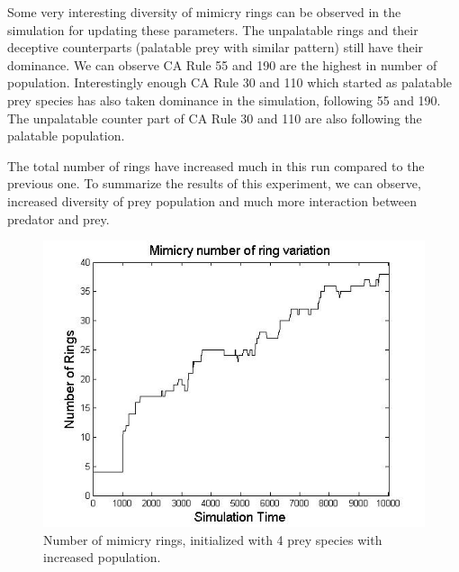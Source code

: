 \documentclass[letterpaper]{article}
\numberwithin{equation}{section}
\begin{document}
Some very interesting diversity of mimicry rings can be observed in the simulation for updating these parameters. The unpalatable rings and their deceptive counterparts (palatable prey with similar pattern) still have their dominance. We can observe CA Rule 55 and 190 are the highest in number of population. Interestingly enough CA Rule 30 and 110 which started as palatable prey species has also taken dominance in the simulation, following 55 and 190. The unpalatable counter part of CA Rule 30 and 110 are also following the palatable population. 

The total number of rings have increased much in this run compared to the previous one. To summarize the results of this experiment, we can observe, increased diversity of prey population and much more interaction between predator and prey.

\begin{figure}[H]
	\centering
	\includegraphics[scale=0.40]{../tex/images/ringSize10k-4MorePrey}
	\caption[Number of mimicry rings (4 prey species, increased population)]{Number of mimicry rings, initialized with 4 prey species with increased population.}
	\label{fig:ringSize10k-4MorePrey}
\end{figure}
\end{document}
